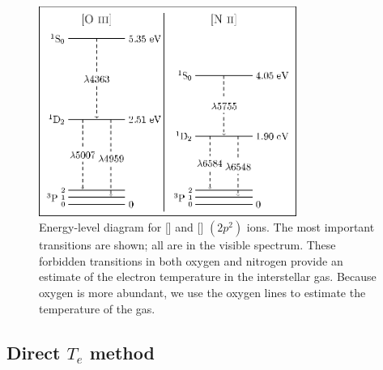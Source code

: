 \begin{figure}
    \centering
    \includegraphics[width=0.75\textwidth]{Images/Paper2/NIIOIII_energy_level_diagram-figure0}
    \caption[{[] and [] energy-level diagram}]{Energy-level 
    diagram for [] and [] $(2p^2)$ ions.  The most important 
    transitions are shown; all are in the visible spectrum.  These forbidden 
    transitions in both oxygen and nitrogen provide an estimate of the electron 
    temperature in the interstellar gas.  Because oxygen is more abundant, we 
    use the oxygen lines to estimate the temperature of the gas.}
    \label{fig:transitions_P2}
\end{figure}


\subsection{Direct $T_e$ method}

